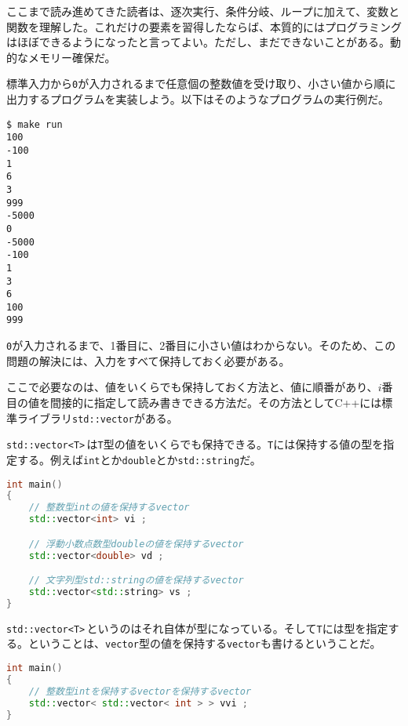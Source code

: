 

ここまで読み進めてきた読者は、逐次実行、条件分岐、ループに加えて、変数と関数を理解した。これだけの要素を習得したならば、本質的にはプログラミングはほぼできるようになったと言ってよい。ただし、まだできないことがある。動的なメモリー確保だ。

標準入力から\texttt{0}が入力されるまで任意個の整数値を受け取り、小さい値から順に出力するプログラムを実装しよう。以下はそのようなプログラムの実行例だ。

\begin{lstlisting}[style=terminal]
$ make run
100
-100
1
6
3
999
-5000
0
-5000
-100
1
3
6
100
999
\end{lstlisting}

\texttt{0}が入力されるまで、1番目に、2番目に小さい値はわからない。そのため、この問題の解決には、入力をすべて保持しておく必要がある。

ここで必要なのは、値をいくらでも保持しておく方法と、値に順番があり、\(i\)番目の値を間接的に指定して読み書きできる方法だ。その方法としてC++には標準ライブラリ\texttt{std::vector}がある。


\texttt{std::vector<T>}\,は\texttt{T}型の値をいくらでも保持できる。\texttt{T}には保持する値の型を指定する。例えば\texttt{int}とか\texttt{double}とか\texttt{std::string}だ。

\begin{lstlisting}[language={C++}]
int main()
{
    // 整数型intの値を保持するvector
    std::vector<int> vi ;

    // 浮動小数点数型doubleの値を保持するvector
    std::vector<double> vd ;

    // 文字列型std::stringの値を保持するvector
    std::vector<std::string> vs ;
}
\end{lstlisting}

\texttt{std::vector<T>}\,というのはそれ自体が型になっている。そして\texttt{T}には型を指定する。ということは、\texttt{vector}型の値を保持する\texttt{vector}も書けるということだ。

\begin{lstlisting}[language={C++}]
int main()
{
    // 整数型intを保持するvectorを保持するvector
    std::vector< std::vector< int > > vvi ;
}
\end{lstlisting}

